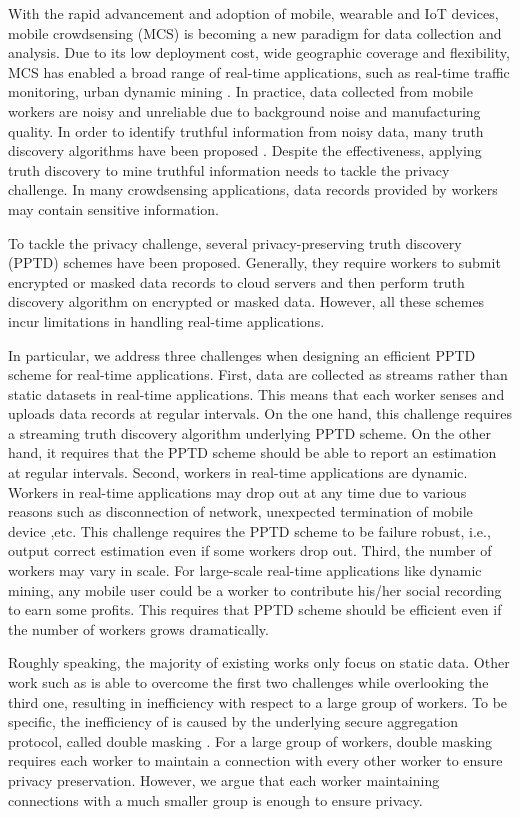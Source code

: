 \documentclass[conference,a4paper]{IEEEtran}
\begin{document}
With the rapid advancement and adoption of mobile, wearable and IoT devices, mobile crowdsensing (MCS) is becoming a new paradigm for data collection and analysis. Due to its low deployment cost, wide geographic coverage and flexibility, MCS has enabled a broad range of real-time applications, such as real-time traffic monitoring\cite{trafficapplication}, urban dynamic mining \cite{urbanmining}. In practice, data collected from mobile workers are noisy and unreliable due to background noise and manufacturing quality. In order to identify truthful information from noisy data, many truth discovery algorithms have been proposed \cite{CRH,CATD}. Despite the effectiveness, applying truth discovery to mine truthful information needs to tackle the privacy challenge. In many crowdsensing applications, data records provided by workers may contain sensitive information.


To tackle the privacy challenge, several privacy-preserving truth discovery (PPTD) schemes \cite{miao,rptd,inpptd,rtpt} have been proposed. Generally, they require workers to submit encrypted or masked data records to cloud servers and then perform truth discovery algorithm on encrypted or masked data. However, all these schemes incur limitations in handling real-time applications.

In particular, we address three challenges when designing an efficient PPTD scheme for real-time applications. First, data are collected as streams rather than static datasets in real-time applications. This means that each worker senses and uploads data records at regular intervals. On the one hand, this challenge requires a streaming truth discovery algorithm underlying PPTD scheme. On the other hand, it requires that the PPTD scheme should be able to report an estimation at regular intervals. Second, workers in real-time applications are dynamic. Workers in real-time applications may drop out at any time due to various reasons such as disconnection of network, unexpected termination of mobile device ,etc. This challenge requires the PPTD scheme to be failure robust, i.e., output correct estimation even if some workers drop out. Third, the number of workers may vary in scale. For large-scale real-time applications like dynamic mining, any mobile user could be a worker to contribute his/her social recording to earn some profits. This requires that PPTD scheme should be efficient even if the number of workers grows dramatically.

Roughly speaking, the majority of existing works \cite{miao,rptd,inpptd} only focus on static data. Other work such as \cite{rtpt} is able to overcome the first two challenges while overlooking the third one, resulting in inefficiency with respect to a large group of workers. To be specific, the inefficiency of \cite{rtpt} is caused by the underlying secure aggregation protocol, called double masking \cite{doublemasking}. For a large group of workers, double masking requires each worker to maintain a connection with every other worker to ensure privacy preservation. However, we argue that each worker maintaining connections with a much smaller group is enough to ensure privacy.
\end{document}
